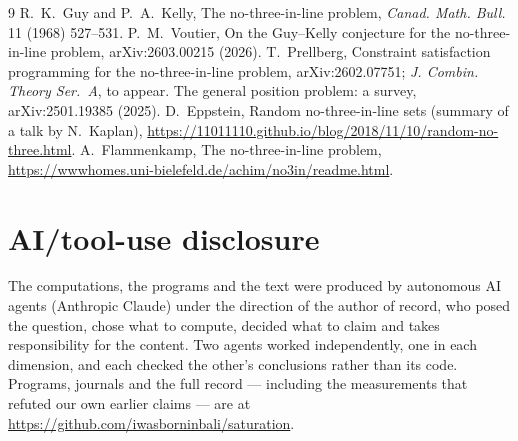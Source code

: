 \documentclass[11pt,a4paper]{article}
\begin{document}
\begin{thebibliography}{9}
 R.~K.~Guy and P.~A.~Kelly, The no-three-in-line problem, \emph{Canad. Math. Bull.} 11 (1968) 527--531.
 P.~M.~Voutier, On the Guy--Kelly conjecture for the no-three-in-line problem, arXiv:2603.00215 (2026).
 T.~Prellberg, Constraint satisfaction programming for the no-three-in-line problem, arXiv:2602.07751; \emph{J. Combin. Theory Ser.~A}, to appear.
 The general position problem: a survey, arXiv:2501.19385 (2025).
 D.~Eppstein, Random no-three-in-line sets (summary of a talk by N.~Kaplan), \url{https://11011110.github.io/blog/2018/11/10/random-no-three.html}.
 A.~Flammenkamp, The no-three-in-line problem, \url{https://wwwhomes.uni-bielefeld.de/achim/no3in/readme.html}.
\end{thebibliography}

\section*{AI/tool-use disclosure}
The computations, the programs and the text were produced by autonomous AI agents (Anthropic Claude)
under the direction of the author of record, who posed the question, chose what to compute, decided
what to claim and takes responsibility for the content.  Two agents worked independently, one in
each dimension, and each checked the other's conclusions rather than its code.  Programs, journals
and the full record --- including the measurements that refuted our own earlier claims --- are at
\url{https://github.com/iwasborninbali/saturation}.
\end{document}
